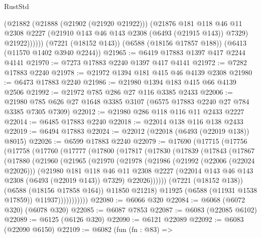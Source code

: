 \begin{lexlean}{RustStd}
\begin{coremodule}
            (@21882
              (@21888 (@21902 (@21920 @21922)))
              (@21876
                @181
                @118
                @46
                @11
                @2308
                @2227
                (@21910 @143 @46 @143 @2308 (@6493 (@21915 @143)) @7329)
                @21922))))))
    (@7221 (@18152 @143))
    (@6588 (@18156 @17857 @188))
    (@6413 (@11570 @1402 @3940 @2244))
@21965 := @6419 @17883 @1397 @417 @2244 @4141
@21970 := @7273 @17883 @2240 @1397 @417 @4141
@21972 := @7282 @17883 @2240
@21978 := @21972 @1394 @181 @415 @46 @4139 @2308
@21980 := @6473 @17883 @2240
@21986 := @21980 @1394 @183 @415 @66 @4139 @2506
@21992 := @21972 @785 @286 @27 @116 @3385 @2433
@22006 := @21980 @785 @626 @27 @1648 @3385 @3107 (@6575 @17883 @2240 @27 @784 @3385 @7305 @7309)
@22012 := @21980 @286 @118 @116 @11 @2433 @2227
@22014 := @6485 @17883 @2240
@22018 := @22014 @138 @116 @138 @2433
@22019 := @6494 @17883
@22024 := @22012 (@22018 (@6493 (@22019 @138)) @8015)
@22026 := @6599 @17883 @2240
@22079 := @17690
    (@17715
      (@17756
        (@17758
          (@17760
            (@17777
              (@17800
                (@17817
                  (@17830
                    (@17839
                      (@17843
                        (@17867
                          (@17880
                            (@21960
                              (@21965
                                (@21970
                                  (@21978
                                    (@21986
                                      (@21992 (@22006 (@22024 @22026)))
                                      (@21980
                                        @181
                                        @118
                                        @46
                                        @11
                                        @2308
                                        @2227
                                        (@22014 @143 @46 @143 @2308 (@6493 (@22019 @143)) @7329)
                                        @22026))))))
                            (@7221 (@18152 @138))
                            (@6588 (@18156 @17858 @164))
                            @11850
                            @21218)
                          @11925
                          (@6588 (@11931 @1538 @17859))
                          @11937)))))))))))
@22080 := @6066 @320
@22084 := @6068 (@6072 @320) (@6078 @320)
@22085 := @6087 @7853
@22087 := @6083 (@22085 @6102)
@22089 := @6125 (@6126 @320)
@22090 := @6121 @22089
@22092 := @6083 (@22090 @6150)
@22109 := @6082
    (fun (fn : @83) =>

\end{coremodule}
\end{lexlean}
